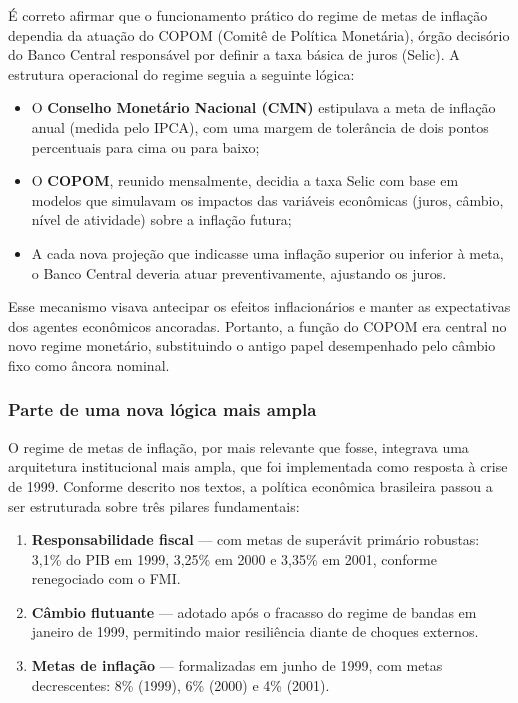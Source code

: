 \documentclass[a4paper,12pt]{article}[abntex2]
\begin{document}
É correto afirmar que o funcionamento prático do regime de metas de inflação dependia da atuação do COPOM (Comitê de Política Monetária), órgão decisório do Banco Central responsável por definir a taxa básica de juros (Selic). A estrutura operacional do regime seguia a seguinte lógica:

\begin{itemize}
    \item O \textbf{Conselho Monetário Nacional (CMN)} estipulava a meta de inflação anual (medida pelo IPCA), com uma margem de tolerância de dois pontos percentuais para cima ou para baixo;
    \item O \textbf{COPOM}, reunido mensalmente, decidia a taxa Selic com base em modelos que simulavam os impactos das variáveis econômicas (juros, câmbio, nível de atividade) sobre a inflação futura;
    \item A cada nova projeção que indicasse uma inflação superior ou inferior à meta, o Banco Central deveria atuar preventivamente, ajustando os juros.
\end{itemize}

Esse mecanismo visava antecipar os efeitos inflacionários e manter as expectativas dos agentes econômicos ancoradas. Portanto, a função do COPOM era central no novo regime monetário, substituindo o antigo papel desempenhado pelo câmbio fixo como âncora nominal.

\subsubsection{\textbf{Parte de uma nova lógica mais ampla}}

O regime de metas de inflação, por mais relevante que fosse, integrava uma arquitetura institucional mais ampla, que foi implementada como resposta à crise de 1999. Conforme descrito nos textos, a política econômica brasileira passou a ser estruturada sobre três pilares fundamentais:

\begin{enumerate}
    \item \textbf{Responsabilidade fiscal} — com metas de superávit primário robustas: 3,1\% do PIB em 1999, 3,25\% em 2000 e 3,35\% em 2001, conforme renegociado com o FMI.
    \item \textbf{Câmbio flutuante} — adotado após o fracasso do regime de bandas em janeiro de 1999, permitindo maior resiliência diante de choques externos.
    \item \textbf{Metas de inflação} — formalizadas em junho de 1999, com metas decrescentes: 8\% (1999), 6\% (2000) e 4\% (2001).
\end{enumerate}
\end{document}
